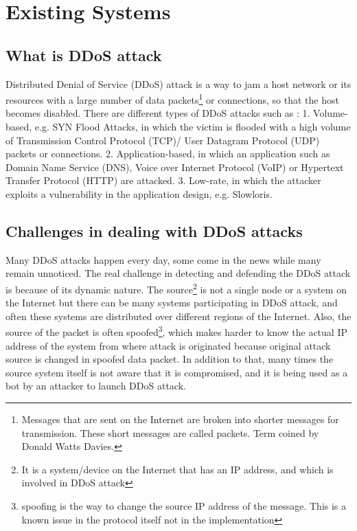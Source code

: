 \documentclass[12pt,oneside,a4paper]{article}
\begin{document}

\doublespacing
\renewcommand{\thepage}{\roman{page}}%
\setcounter{page}{2}%

\tableofcontents
\newpage
\pagestyle{myheadings}

\pagebreak
\renewcommand{\thepage}{\arabic{page}}%

\section{Existing Systems}

\subsection{What is DDoS attack}
Distributed Denial of Service (DDoS) attack is a way to jam a host network or its resources with a large number of data packets\footnote{Messages that are sent on the Internet are broken into shorter messages for transmission. These short messages are called packets. Term coined by Donald Watts Davies.} \cite{network-data-packet} or connections, so that the host becomes disabled. There are different types of DDoS attacks such as :
1. Volume-based, e.g. SYN Flood Attacks, in which the victim is flooded with a high volume of  Transmission Control Protocol (TCP)/ User Datagram Protocol (UDP) packets or connections.
2. Application-based, in which an application such as Domain Name Service (DNS), Voice over Internet Protocol (VoIP) or Hypertext Transfer Protocol (HTTP) are attacked.
3. Low-rate, in which the attacker exploits a vulnerability in the application design, e.g. Slowloris.
\cite{DDoS-attacks}

\subsection{Challenges in dealing with DDoS attacks}
Many DDoS attacks happen every day\cite{ddos-attack-news}, some come in the news while many remain unnoticed. The real challenge in detecting and defending the DDoS attack is because of its dynamic nature. The source\footnote{It is a system/device on the Internet that has an IP address, and which is involved in DDoS attack} is not a single node or a system on the Internet but there can be many systems participating in DDoS attack, and often these systems are distributed over different regions of the Internet. Also, the source of the packet is often spoofed\footnote{spoofing is the way to change the source IP address of the message. This is a known issue in the protocol itself not in the implementation}\cite{ip-spoofing}, which makes harder to know the actual IP address of the system from where attack is originated because original attack source is changed in spoofed data packet. In addition to that, many times the source system itself is not aware that it is compromised, and it is being used as a bot\cite{bot} by an attacker to launch DDoS attack.
\end{document}
